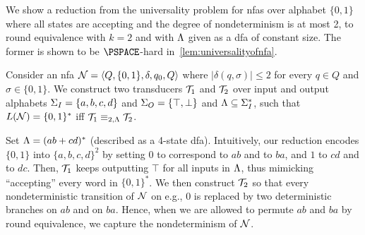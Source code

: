 We show a reduction from the universality problem for \glspl{nfa} over alphabet $\{0,1\}$ where all states are accepting and the degree of nondeterminism is at most 2, to round equivalence with $k=2$ and with $\Lambda$ given as a \gls{dfa} of constant size. The former is shown to be $\PSPACE$-hard in~\cref{lem:universalityofnfa}.

Consider an \gls{nfa} $\mathcal{N}=\left< Q,\{0,1\},\delta,q_0,Q\right>$ where $|\delta(q,\sigma)|\le 2$ for every $q\in Q$ and $\sigma\in \{0,1\}$.
We construct two transducers $\mathcal{T}_1$ and $\mathcal{T}_2$ over input and output alphabets $\Sigma_{I}=\{a,b,c,d\}$ and $\Sigma_{O}=\{\top,\bot\}$ and $\Lambda\subseteq \Sigma_{I}^*$, such that $L(\mathcal{N})=\{0,1\}^*$ iff $\mathcal{T}_1\equiv_{2,\Lambda}\mathcal{T}_2$. 

Set $\Lambda=(ab+cd)^*$ (described as a 4-state \gls{dfa}). Intuitively, our reduction encodes $\{0,1\}$ into $\{a,b,c,d\}^2$ by setting $0$ to correspond to $ab$ and to $ba$, and $1$ to $cd$ and to $dc$. Then, $\mathcal{T}_1$ keeps outputting $\top$ for all inputs in $\Lambda$, thus mimicking ``accepting'' every word in $\{0,1\}^*$. We then construct $\mathcal{T}_2$ so that every nondeterministic transition of $\mathcal{N}$ on e.g., $0$ is replaced by two deterministic branches on $ab$ and on $ba$. Hence, when we are allowed to permute $ab$ and $ba$ by round equivalence, we capture the nondeterminism of $\mathcal{N}$. 

